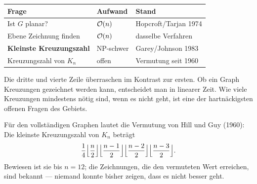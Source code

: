 \begin{forschung}
\begin{center}
{\small
\renewcommand{\arraystretch}{1.45}
\begin{tabular}{@{}P{3.0cm}P{2.2cm}P{3.0cm}@{}}
\toprule
\textbf{Frage} & \textbf{Aufwand} & \textbf{Stand}\\
\midrule
Ist $G$ planar? & \textcolor{gruen}{$\mathcal{O}(n)$} & Hopcroft/Tarjan 1974\\
Ebene Zeichnung finden & \textcolor{gruen}{$\mathcal{O}(n)$} & dasselbe Verfahren\\
\textbf{Kleinste Kreuzungszahl} & \textcolor{akzent}{NP-schwer} & Garey/Johnson 1983\\
Kreuzungszahl von $K_n$ & \textcolor{akzent}{offen} & Vermutung seit 1960\\
\bottomrule
\end{tabular}}
\end{center}

Die dritte und vierte Zeile überraschen im Kontrast zur ersten. Ob ein Graph  Kreuzungen gezeichnet werden kann, entscheidet man in linearer Zeit. Wie viele Kreuzungen mindestens nötig sind, wenn es nicht geht, ist eine der hartnäckigsten offenen Fragen des Gebiets.

Für den vollständigen Graphen lautet die Vermutung von Hill und Guy (1960): Die kleinste Kreuzungszahl von $K_n$ beträgt
\[ \frac{1}{4}\Bigl\lfloor \frac{n}{2}\Bigr\rfloor \Bigl\lfloor \frac{n-1}{2}\Bigr\rfloor \Bigl\lfloor \frac{n-2}{2}\Bigr\rfloor \Bigl\lfloor \frac{n-3}{2}\Bigr\rfloor . \]
Bewiesen ist sie bis $n = 12$; die Zeichnungen, die den vermuteten Wert erreichen, sind bekannt --- niemand konnte bisher zeigen, dass es nicht besser geht.

\begin{center}
\begin{minipage}{0.88\textwidth}
\end{minipage}
\end{center}
\end{forschung}

